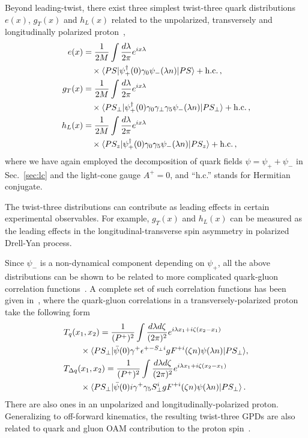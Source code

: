 Beyond leading-twist, there exist three simplest twist-three quark distributions
$e(x)$, $g_T(x)$ and $h_L(x)$ related to the unpolarized, transversely and longitudinally polarized
proton~\cite{Jaffe:1991ra},
\begin{align}
	e(x) &= \frac{1}{2M}\int \frac{d\lambda}{2\pi}e^{ix\lambda} \\
	&\quad\times \langle PS|\psi^\dagger_+(0)\gamma_0\psi_-(\lambda n)|PS\rangle + {\rm h.c.}  \,, \nonumber\\
	g_T(x)& = \frac{1}{2M}\int \frac{d\lambda}{2\pi}e^{ix\lambda}  \\
	&\quad\times \langle PS_\perp|\psi^\dagger_+(0)\gamma_0\gamma_\perp\gamma_5\psi_-(\lambda n)|PS_\perp\rangle + {\rm h.c.} \,,\nonumber\\
	h_L(x)&  =\frac{1}{2M}\int \frac{d\lambda}{2\pi} e^{ix\lambda} \\
	&\quad\times \langle PS_z|\psi^\dagger_+(0)\gamma_0\gamma_5\psi_-(\lambda n)|PS_z\rangle + {\rm h.c.}  \,,\nonumber
	\label{eq:twist3}
\end{align}
where we have again employed the decomposition of quark fields $\psi=\psi_+ +\psi_-$ in Sec.~\ref{sec:lc} and the light-cone gauge $A^+=0$, and ``h.c.'' stands for Hermitian conjugate.

The twist-three distributions can contribute as leading effects in certain experimental observables. For example, $g_T(x)$ and $h_L(x)$ can be measured as the leading effects in the longitudinal-transverse spin asymmetry in polarized Drell-Yan process.

Since $\psi_-$ is a non-dynamical component depending on $\psi_+$, all the above distributions can be shown to be related to more complicated quark-gluon correlation functions~\cite{Ji:1990br,Balitsky:1996uh}. A complete set of such correlation functions has been given in~\cite{Qiu:1991pp,Ji:1992eu,Ji:2001bm,Kang:2008ey}, where the quark-gluon correlations
in a transversely-polarized proton take the following form
\begin{align}
	&T_q(x_1, x_2)=\frac{1}{(P^+)^2}\int\frac{d\lambda d\zeta}{(2\pi)^2}e^{i\lambda x_1+i\zeta(x_2-x_1)}\\
	&\hspace{2em}\times\langle PS_\perp|\bar\psi(0)\gamma^+ \epsilon^{+-S_\perp i}g F^{+i}(\zeta n)\psi(\lambda n)|PS_\perp\rangle,\nonumber\\
	&T_{\Delta q}(x_1, x_2)=\frac{1}{(P^+)^2}\int\frac{d\lambda d\zeta}{(2\pi)^2}e^{i\lambda x_1+i\zeta(x_2-x_1)}\\
	&\hspace{2em}\times\langle PS_\perp|\bar\psi(0)i\gamma^+\gamma_5 S^i_\perp g F^{+i}(\zeta n)\psi(\lambda n)|PS_\perp\rangle\,.\nonumber
\end{align}
There are also ones in an unpolarized and longitudinally-polarized proton.
Generalizing to off-forward kinematics, the resulting twist-three GPDs are also related to quark
and gluon OAM contribution to the proton spin~\cite{Hatta:2012cs,Ji:2012ba}.

